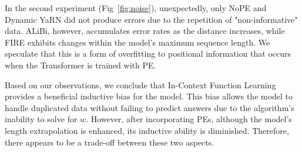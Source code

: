 \documentclass[letterpaper]{article} %
\begin{document}
In the second experiment (Fig~\ref{fig:noise}), unexpectedly, only NoPE and Dynamic YaRN did not produce errors due to the repetition of "non-informative" data. ALiBi, however, accumulates error rates as the distance increases, while FIRE exhibits changes within the model's maximum sequence length. We speculate that this is a form of overfitting to positional information that occurs when the Transformer is trained with PE.

Based on our observations, we conclude that In-Context Function Learning provides a beneficial inductive bias for the model. This bias allows the model to handle duplicated data without failing to predict answers due to the algorithm's inability to solve for $w$. However, after incorporating PEs, although the model's length extrapolation is enhanced, its inductive ability is diminished. Therefore, there appears to be a trade-off between these two aspects.
\end{document}
